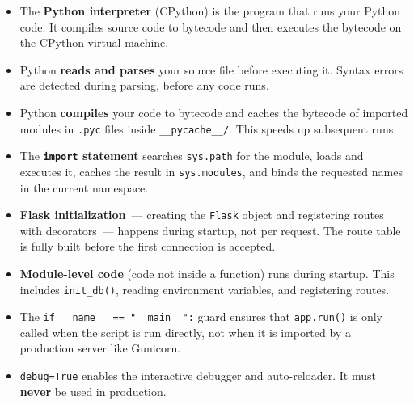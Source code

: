 \label{02-runtime-initialization:key-takeaways}
\begin{takeaways}

\begin{itemize}
\tightlist
\item
  The \textbf{Python interpreter} (CPython) is the program that runs your Python code. It compiles source code to bytecode and then executes the bytecode on the CPython virtual machine.
\item
  Python \textbf{reads and parses} your source file before executing it. Syntax errors are detected during parsing, before any code runs.
\item
  Python \textbf{compiles} your code to bytecode and caches the bytecode of imported modules in \texttt{.pyc} files inside \texttt{\_\_pycache\_\_/}. This speeds up subsequent runs.
\item
  The \textbf{\texttt{import} statement} searches \texttt{sys.path} for the module, loads and executes it, caches the result in \texttt{sys.modules}, and binds the requested names in the current namespace.
\item
  \textbf{Flask initialization}~--- creating the \texttt{Flask} object and registering routes with decorators~--- happens during startup, not per request. The route table is fully built before the first connection is accepted.
\item
  \textbf{Module-level code} (code not inside a function) runs during startup. This includes \texttt{init\_db()}, reading environment variables, and registering routes.
\item
  The \texttt{if\ \_}\allowbreak{}\texttt{\_}\allowbreak{}\texttt{name\_}\allowbreak{}\texttt{\_}\allowbreak{}\texttt{\ =}\allowbreak{}\texttt{=}\allowbreak{}\texttt{\ "\_}\allowbreak{}\texttt{\_}\allowbreak{}\texttt{main\_}\allowbreak{}\texttt{\_}\allowbreak{}\texttt{":} guard ensures that \texttt{app.run()} is only called when the script is run directly, not when it is imported by a production server like Gunicorn.
\item
  \texttt{debug=True} enables the interactive debugger and auto-reloader. It must \textbf{never} be used in production.
\end{itemize}

\end{takeaways}

\label{02-runtime-initialization:exercises}

